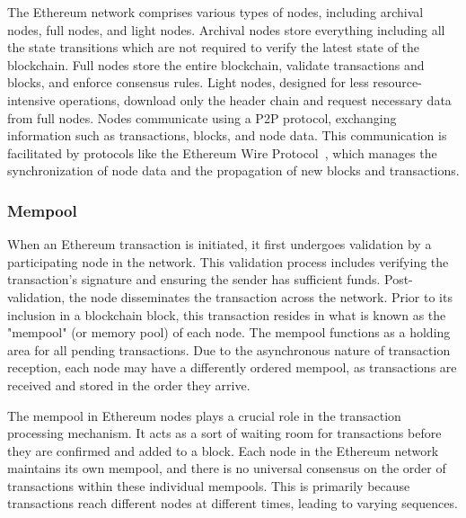 The Ethereum network comprises various types of nodes, including archival nodes, full nodes, and light nodes. Archival nodes store everything including all the state transitions which are not required to verify the latest state of the blockchain. Full nodes store the entire blockchain, validate transactions and blocks, and enforce consensus rules. Light nodes, designed for less resource-intensive operations, download only the header chain and request necessary data from full nodes. Nodes communicate using a P2P protocol, exchanging information such as transactions, blocks, and node data. This communication is facilitated by protocols like the Ethereum Wire Protocol~\cite{ethereumwireprotocol}, which manages the synchronization of node data and the propagation of new blocks and transactions.


\subsubsection{Mempool}
When an Ethereum transaction is initiated, it first undergoes validation by a participating node in the network. This validation process includes verifying the transaction's signature and ensuring the sender has sufficient funds. Post-validation, the node disseminates the transaction across the network. Prior to its inclusion in a blockchain block, this transaction resides in what is known as the "mempool" (or memory pool) of each node. The mempool functions as a holding area for all pending transactions. Due to the asynchronous nature of transaction reception, each node may have a differently ordered mempool, as transactions are received and stored in the order they arrive.

The mempool in Ethereum nodes plays a crucial role in the transaction processing mechanism. It acts as a sort of waiting room for transactions before they are confirmed and added to a block. Each node in the Ethereum network maintains its own mempool, and there is no universal consensus on the order of transactions within these individual mempools. This is primarily because transactions reach different nodes at different times, leading to varying sequences.

